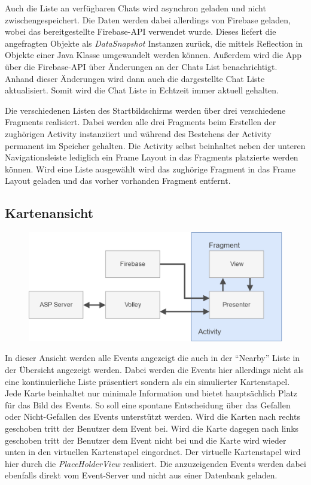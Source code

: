 \documentclass{scrartcl}
\begin{document}
Auch die Liste an verfügbaren Chats wird asynchron geladen und nicht
zwischengespeichert. Die Daten werden dabei allerdings von Firebase geladen,
wobei das bereitgestellte Firebase-API verwendet wurde. Dieses liefert die
angefragten Objekte als \emph{DataSnapshot} Instanzen zurück, die mittels
Reflection in Objekte einer Java Klasse umgewandelt werden können. Außerdem wird
die App über die Firebase-API über Änderungen an der Chats List benachrichtigt.
Anhand dieser Änderungen wird dann auch die dargestellte Chat Liste
aktualisiert. Somit wird die Chat Liste in Echtzeit immer aktuell gehalten.

Die verschiedenen Listen des Startbildschirms werden über drei verschiedene
Fragments realisiert. Dabei werden alle drei Fragments beim Erstellen der
zughörigen Activity instanziiert und während des Bestehens der Activity
permanent im Speicher gehalten. Die Activity selbst beinhaltet neben der unteren
Navigationsleiste lediglich ein Frame Layout in das Fragments platzierte werden
können. Wird eine Liste ausgewählt wird das zughörige Fragment in das Frame
Layout geladen und das vorher vorhanden Fragment entfernt.

\subsection{Kartenansicht}

\begin{figure}[h!tbp]
  \includegraphics[width=\textwidth]{img/architecture}
\end{figure}

In dieser Ansicht werden alle Events angezeigt die auch in der \enquote{Nearby}
Liste in der Übersicht angezeigt werden. Dabei werden die Events hier allerdings
nicht als eine kontinuierliche Liste präsentiert sondern als ein simulierter
Kartenstapel. Jede Karte beinhaltet nur minimale Information und bietet
hauptsächlich Platz für das Bild des Events. So soll eine spontane Entscheidung
über das Gefallen oder Nicht-Gefallen des Events unterstützt werden. Wird die
Karten nach rechts geschoben tritt der Benutzer dem Event bei. Wird die Karte
dagegen nach links geschoben tritt der Benutzer dem Event nicht bei und die
Karte wird wieder unten in den virtuellen Kartenstapel eingordnet. Der virtuelle
Kartenstapel wird hier durch die \emph{PlaceHolderView} realisiert. Die
anzuzeigenden Events werden dabei ebenfalls direkt vom Event-Server und nicht
aus einer Datenbank geladen.
\end{document}
